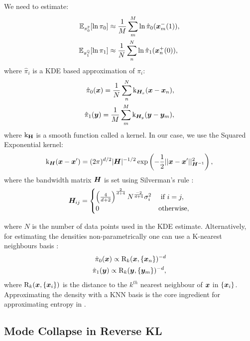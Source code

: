 \documentclass[a4paper,12pt,twoside,openright]{report}
\theoremstyle{definition}
\begin{document}
We need to estimate:
\begin{align*}
\mathbb{E}_{\pi_0^{\mathbb{P}}}[\ln\pi_{0}] &\approx \frac{1}{M}\sum_{m}^{M} \ln \hat{\pi}_0({\bm{x}}_m^{-}(1)), \\
\mathbb{E}_{\pi_1^{\mathbb{Q}}}[\ln\pi_{1}] &\approx \frac{1}{N}\sum_{n}^{N} \ln \hat{\pi}_1({\bm{x}}_n^{+}(0)),
\end{align*}
where $\hat{\pi}_i$ is a KDE based approximation of $\pi_i$:
\begin{align*}
\hat{\pi}_0({\bm{x}}) = \frac{1}{N} \sum_n^{N} {\text{k}}_{{\bm{H}}_x}({\bm{x}} - {\bm{x}}_n), \\
\hat{\pi}_1({\bm{y}}) = \frac{1}{M} \sum_m^{M} {\text{k}}_{{\bm{H}}_y}({\bm{y}} - {\bm{y}}_m),
\end{align*}
where ${\text{k}}_{\textbf{H}}$ is a smooth function called a kernel. In our case, we use the Squared Exponential kernel:
\begin{align*}
{\text{k}}_{{\bm{H}}}({\bm{x}}-{\bm{x}}') = (2\pi)^{d/2}|{\bm{H}}|^{-1/2}\exp\left(-\frac{1}{2}||{\bm{x}}-{\bm{x}}'||^{2}_{{\bm{H}}^{-1}}\right),
\end{align*}
where the bandwidth matrix ${\bm{H}}$ is set using Silverman's rule \citep{silverman1986density}:
\begin{align}
{\bm{H}}_{ij} = \begin{cases}
\left(\frac{4}{d+2}\right)^{\frac{2}{d+4}} N^{\frac{-2}{d+4}} \sigma_{i}^2  &\text{  if  } i=j, \\
0  &\text{otherwise},
\end{cases}
\end{align}

where $N$ is the number of data points used in the KDE estimate. Alternatively, for estimating the densities non-parametrically one can use a K-nearest neighbours basis \citep{veksler2013nonparametric}:
\begin{align*}
\hat{\pi}_0({\bm{x}}) \propto  \text{R}_k({\bm{x}}, \{{\bm{x}}_n\})^{-d}\\
\hat{\pi}_1({\bm{y}}) \propto \text{R}_k({\bm{y}}, \{{\bm{y}}_m\})^{-d},
\end{align*}
where $\text{R}_k({\bm{x}}, \{{\bm{x}}_i\})$ is the distance to the $k^{th}$ nearest neighbour of ${\bm{x}}$ in $\{{\bm{x}}_i\}$.  Approximating the density with a KNN basis is the core ingredient for approximating entropy in \cite{singh2016analysis}.

\subsection{Mode Collapse in Reverse KL}
\end{document}

